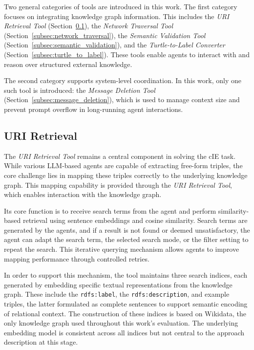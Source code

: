 \documentclass[a4paper,oneside,bibliography=totoc]{scrbook}
\begin{document}
Two general categories of tools are introduced in this work. The first category focuses on integrating knowledge graph information. This includes the \textit{URI Retrieval Tool} (Section~\ref{subsec:uri_retrieval}), the \textit{Network Traversal Tool} (Section~\ref{subsec:network_traversal}), the \textit{Semantic Validation Tool} (Section~\ref{subsec:semantic_validation}), and the \textit{Turtle-to-Label Converter} (Section~\ref{subsec:turtle_to_label}). These tools enable agents to interact with and reason over structured external knowledge.

The second category supports system-level coordination. In this work, only one such tool is introduced: the \textit{Message Deletion Tool} (Section~\ref{subsec:message_deletion}), which is used to manage context size and prevent prompt overflow in long-running agent interactions.

\subsection{URI Retrieval}
\label{subsec:uri_retrieval}

The \textit{URI Retrieval Tool} remains a central component in solving the \ac{cIE} task. While various \ac{LLM}-based agents are capable of extracting free-form triples, the core challenge lies in mapping these triples correctly to the underlying knowledge graph. This mapping capability is provided through the \textit{URI Retrieval Tool}, which enables interaction with the knowledge graph.

Its core function is to receive search terms from the agent and perform similarity-based retrieval using sentence embeddings and cosine similarity. Search terms are generated by the agents, and if a result is not found or deemed unsatisfactory, the agent can adapt the search term, the selected search mode, or the filter setting to repeat the search.
This iterative querying mechanism allows agents to improve mapping performance through controlled retries.

In order to support this mechanism, the tool maintains three search indices, each generated by embedding specific textual representations from the knowledge graph. These include the \texttt{rdfs:label}, the \texttt{rdfs:description}, and example triples, the latter formulated as complete sentences to support semantic encoding of relational context. The construction of these indices is based on Wikidata, the only knowledge graph used throughout this work’s evaluation. The underlying embedding model is consistent across all indices but not central to the approach description at this stage.
\end{document}
